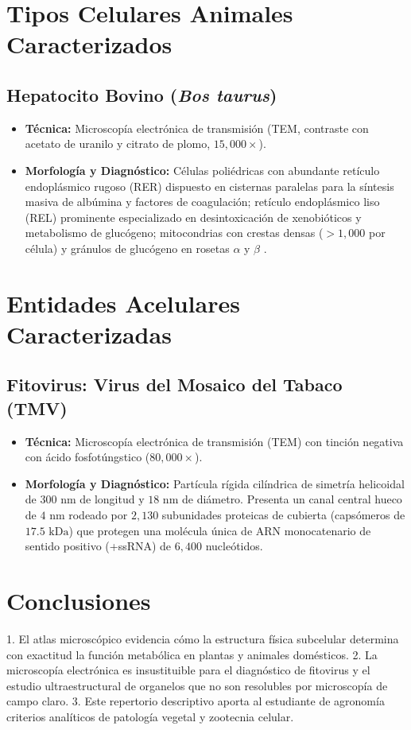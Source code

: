 \documentclass[12pt,spanish,letterpaper,oneside]{article}
\begin{document}
\section{Tipos Celulares Animales Caracterizados}
\subsection{Hepatocito Bovino (\textit{Bos taurus})}
\begin{itemize}
    \item \textbf{Técnica:} Microscopía electrónica de transmisión (TEM, contraste con acetato de uranilo y citrato de plomo, $15,000\times$).
    \item \textbf{Morfología y Diagnóstico:} Células poliédricas con abundante retículo endoplásmico rugoso (RER) dispuesto en cisternas paralelas para la síntesis masiva de albúmina y factores de coagulación; retículo endoplásmico liso (REL) prominente especializado en desintoxicación de xenobióticos y metabolismo de glucógeno; mitocondrias con crestas densas ($>1,000$ por célula) y gránulos de glucógeno en rosetas $\alpha$ y $\beta$ \parencite{lodish2016}.
\end{itemize}

\section{Entidades Acelulares Caracterizadas}
\subsection{Fitovirus: Virus del Mosaico del Tabaco (TMV)}
\begin{itemize}
    \item \textbf{Técnica:} Microscopía electrónica de transmisión (TEM) con tinción negativa con ácido fosfotúngstico ($80,000\times$).
    \item \textbf{Morfología y Diagnóstico:} Partícula rígida cilíndrica de simetría helicoidal de $300\text{ nm}$ de longitud y $18\text{ nm}$ de diámetro. Presenta un canal central hueco de $4\text{ nm}$ rodeado por $2,130$ subunidades proteicas de cubierta (capsómeros de $17.5\text{ kDa}$) que protegen una molécula única de ARN monocatenario de sentido positivo (+ssRNA) de $6,400$ nucleótidos.
\end{itemize}

\section{Conclusiones}
1. El atlas microscópico evidencia cómo la estructura física subcelular determina con exactitud la función metabólica en plantas y animales domésticos.
2. La microscopía electrónica es insustituible para el diagnóstico de fitovirus y el estudio ultraestructural de organelos que no son resolubles por microscopía de campo claro.
3. Este repertorio descriptivo aporta al estudiante de agronomía criterios analíticos de patología vegetal y zootecnia celular.

\newpage
\printbibliography[title={Referencias bibliográficas}]
\end{document}
